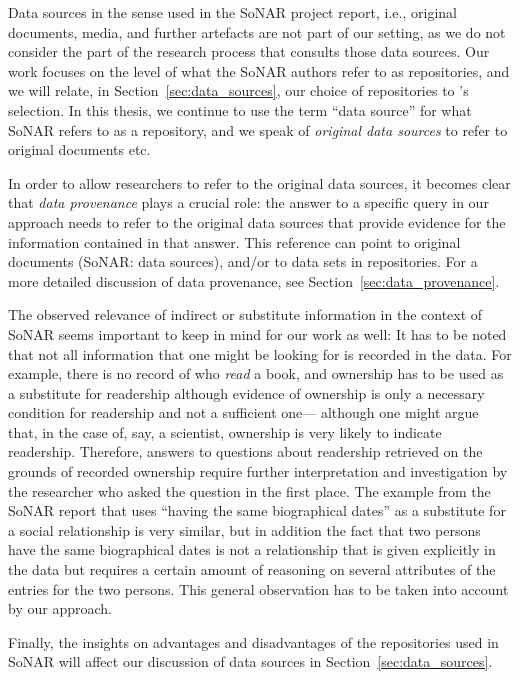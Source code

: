 Data sources in the sense used in the \gls{SoNAR} project report,
i.e., original documents, media, and further artefacts
are not part of our setting, as we do not consider the part of the research process
that consults those data sources. Our work focuses on the level of
what the \gls{SoNAR} authors refer to as repositories,
and we will relate, in Section~\ref{sec:data_sources}, our choice of repositories
to \citeauthor*{Menzel2020}'s \autocite*{Menzel2020} selection.
In this thesis, we continue to use the term \enquote{data source} for what
\gls{SoNAR} refers to as a repository,
and we speak of \emph{original data sources} to refer to original documents etc.

In order to allow researchers to refer to the original data sources,
it becomes clear that \emph{data provenance} plays a crucial role:
the answer to a specific query in our approach needs to refer to
the original data sources that provide evidence for the information contained in that answer.
This reference can point to original documents (\gls{SoNAR}: data sources),
and/or to data sets in repositories. For a more detailed discussion of data provenance,
see Section~\ref{sec:data_provenance}.

The observed relevance of indirect or substitute information in the context of \gls{SoNAR} 
seems important to keep in mind for our work as well: 
It has to be noted that not all information that one might be looking for is recorded
in the data. For example, there is no record of who \emph{read} a book,
and ownership has to be used as a substitute for readership although evidence
of ownership is only a necessary condition for readership and not a sufficient one---%
although one might argue that, in the case of, say, a scientist, ownership is very likely
to indicate readership.
Therefore, answers to questions
about readership retrieved on the grounds of recorded ownership require further interpretation and investigation
by the researcher who asked the question in the first place.
The example from the \gls{SoNAR} report that uses \enquote{having the same biographical dates}
as a substitute for a social relationship is very similar, but in addition
the fact that two persons have the same biographical dates is not a relationship that is
given explicitly in the data but requires a certain amount of reasoning on several attributes of the entries
for the two persons.
This general observation has to be taken into account by our approach.

Finally, the insights on advantages and disadvantages of the repositories used in \gls{SoNAR}
will affect our discussion of data sources in Section~\ref{sec:data_sources}.

